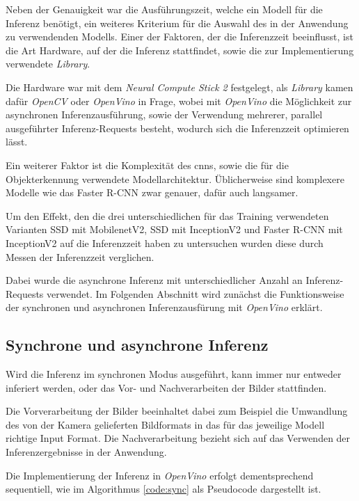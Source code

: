 Neben der Genauigkeit war die Ausführungszeit, welche ein Modell
für die Inferenz benötigt, ein weiteres Kriterium für die Auswahl
des in der Anwendung zu verwendenden Modells.
Einer der Faktoren, der die Inferenzzeit beeinflusst,
ist die Art Hardware, auf der die Inferenz stattfindet,
sowie die zur Implementierung verwendete \textit{Library}.

Die Hardware war mit dem \textit{Neural Compute Stick 2}
festgelegt, als \textit{Library} kamen dafür \textit{OpenCV}
oder \textit{OpenVino} in Frage, wobei mit
\textit{OpenVino} die Möglichkeit 
zur asynchronen Inferenzausführung, sowie der Verwendung mehrerer,
parallel ausgeführter Inferenz-Requests besteht,
wodurch sich die Inferenzzeit optimieren lässt.

Ein weiterer Faktor ist die Komplexität des \Glspl{cnn}, sowie die 
für die Objekterkennung verwendete Modellarchitektur.
Üblicherweise sind komplexere Modelle wie das Faster R-CNN
zwar genauer, dafür auch langsamer.

Um den Effekt, den die drei unterschiedlichen
für das Training verwendeten Varianten SSD mit MobilenetV2, 
SSD mit InceptionV2 und Faster R-CNN mit InceptionV2 auf die
Inferenzzeit haben zu untersuchen
wurden diese durch Messen der Inferenzzeit verglichen.

Dabei wurde die asynchrone Inferenz mit unterschiedlicher Anzahl 
an Inferenz-Requests verwendet.
Im Folgenden Abschnitt wird zunächst die Funktionsweise der synchronen und asynchronen
Inferenzausfürung mit \textit{OpenVino} erklärt.



\subsection{Synchrone und asynchrone Inferenz}

Wird die Inferenz im synchronen Modus ausgeführt, kann immer
nur entweder inferiert werden, oder das Vor- und 
Nachverarbeiten der Bilder stattfinden.

Die Vorverarbeitung der Bilder beeinhaltet dabei
zum Beispiel die Umwandlung des von der Kamera gelieferten 
Bildformats in das für das jeweilige Modell richtige 
Input Format.
Die Nachverarbeitung bezieht sich auf das Verwenden 
der Inferenzergebnisse in der Anwendung.

Die Implementierung der Inferenz in \textit{OpenVino} erfolgt
dementsprechend sequentiell, wie im Algorithmus
\ref{code:sync} als Pseudocode dargestellt ist.

